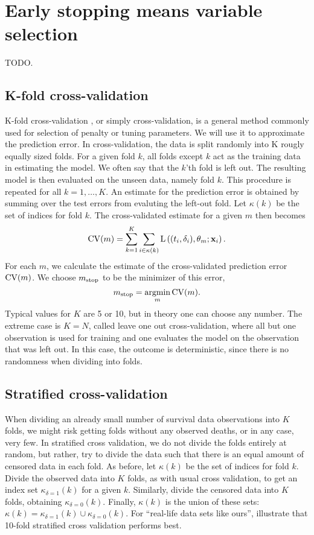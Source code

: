 \section{Early stopping means variable selection}
TODO.

\subsection{K-fold cross-validation}
K-fold cross-validation \citep{lachenbruch}, or simply cross-validation, is a general method commonly used for selection of penalty or tuning parameters. We will use it to approximate the prediction error. In cross-validation, the data is split randomly into K rougly equally sized folds. For a given fold $k$, all folds except $k$ act as the training data in estimating the model. We often say that the $k$'th fold is left out. The resulting model is then evaluated on the unseen data, namely fold $k$. This procedure is repeated for all $k=1,\ldots,K$. An estimate for the prediction error is obtained by summing over the test errors from evaluting the left-out fold. Let $\kappa(k)$ be the set of indices for fold $k$. The cross-validated estimate for a given $m$ then becomes
\begin{equation}
    \operatorname{CV}(m)=\sum_{k=1}^K\sum_{i\in\kappa(k)}\operatorname{L}\left((t_i,\delta_i),\theta_m;\mathbf{x}_i\right).
\end{equation}
For each $m$, we calculate the estimate of the cross-validated prediction error $\operatorname{CV}(m)$. We choose $m_{\text{stop}}$ to be the minimizer of this error,
\begin{equation}
    m_{\text{stop}}=\operatorname*{argmin}_{m}\operatorname{CV}(m).
\end{equation}
Typical values for $K$ are 5 or 10, but in theory one can choose any number. The extreme case is $K=N$, called leave one out cross-validation, where all but one observation is used for training and one evaluates the model on the observation that was left out. In this case, the outcome is deterministic, since there is no randomness when dividing into folds.

\subsection{Stratified cross-validation}
When dividing an already small number of survival data observations into $K$ folds, we might risk getting folds without any observed deaths, or in any case, very few. In stratified cross validation, we do not divide the folds entirely at random, but rather, try to divide the data such that there is an equal amount of censored data in each fold.
As before, let $\kappa(k)$ be the set of indices for fold $k$. Divide the observed data into $K$ folds, as with usual cross validation, to get an index set $\kappa_{\delta=1}(k)$ for a given $k$. Similarly, divide the censored data into $K$ folds, obtaining $\kappa_{\delta=0}(k)$. Finally, $\kappa(k)$ is the union of these sets: $\kappa(k)=\kappa_{\delta=1}(k)\cup\kappa_{\delta=0}(k)$. For ``real-life data sets like ours'', \citet{kohavi} illustrate that 10-fold stratified cross validation performs best.

